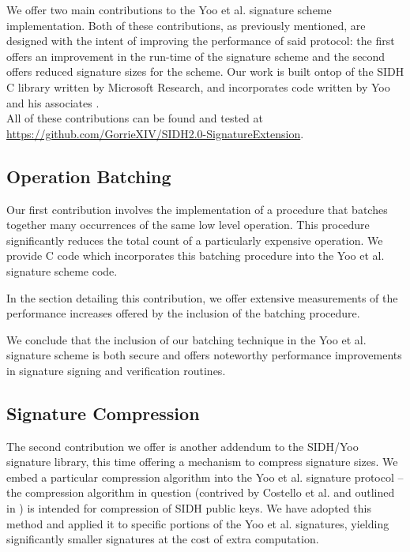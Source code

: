 We offer two main contributions to the Yoo et al. signature scheme implementation. Both of these contributions, as previously mentioned, are designed with the intent of improving the performance of said protocol: the first offers an improvement in the run-time of the signature scheme and the second offers reduced signature sizes for the scheme. Our work is built ontop of the SIDH C library written by Microsoft Research, and incorporates code written by Yoo and his associates \cite{sidhcode}\cite{yoosigcode}.\\

\noindent
All of these contributions can be found and tested at \url{https://github.com/GorrieXIV/SIDH2.0-SignatureExtension}. 

\subsection{Operation Batching}

Our first contribution involves the implementation of a procedure that batches together many occurrences of the same low level operation. This procedure significantly reduces the total count of a particularly expensive operation. We provide C code which incorporates this batching procedure into the Yoo et al. signature scheme code.

In the section detailing this contribution, we offer extensive measurements of the performance increases offered by the inclusion of the batching procedure.

We conclude that the inclusion of our batching technique in the Yoo et al. signature scheme is both secure and offers noteworthy performance improvements in signature signing and verification routines.

\subsection{Signature Compression}

The second contribution we offer is another addendum to the SIDH/Yoo signature library, this time offering a mechanism to  compress signature sizes.  We embed a particular compression algorithm into the Yoo et al. signature protocol -- the compression algorithm in question (contrived by Costello et al. and outlined in \cite{pkcomp}) is intended for compression of SIDH public keys. We have adopted this method and applied it to specific portions of the Yoo et al. signatures, yielding significantly smaller signatures at the cost of extra computation.

